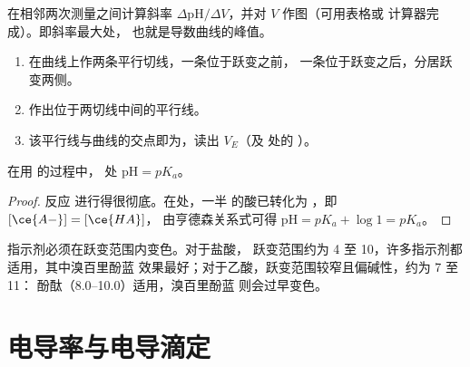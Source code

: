 \begin{method}[导数法]\label{met:g12:ph-conductivity-titrations:derivative}
在相邻两次测量之间计算斜率
$\Delta\mathrm{pH}/\Delta V$，并对 $V$ 作图（可用表格或
计算器完成）。即斜率最大处，
也就是导数曲线的峰值。
\end{method}

\begin{method}[切线法]\label{met:g12:ph-conductivity-titrations:tangent}
\begin{enumerate}
  \item 在曲线上作两条平行切线，一条位于跃变之前，
        一条位于跃变之后，分居跃变两侧。
  \item 作出位于两切线中间的平行线。
  \item 该平行线与曲线的交点即为，读出 $V_E$（及
        处的 ）。
\end{enumerate}
\end{method}

\begin{proposition}[半等当点处，$\mathrm{pH} = pK_a$]\label{prop:g12:ph-conductivity-titrations:half}
在用  的过程中，
处 $\mathrm{pH} = pK_a$。
\end{proposition}

\begin{proof}
反应  进行得很彻底。在处，一半
的酸已转化为 ，即 $[\ce{A-}] = [\ce{HA}]$，
由亨德森关系式可得 $\mathrm{pH} = pK_a + \log 1 = pK_a$。
\end{proof}

\begin{remark}[从曲线选择指示剂]\label{rem:g12:ph-conductivity-titrations:indicator}
指示剂必须在跃变范围内变色。对于盐酸，
跃变范围约为  4 至 10，许多指示剂都适用，其中溴百里酚蓝
效果最好；对于乙酸，跃变范围较窄且偏碱性，约为 7 至 11：
酚酞（8.0--10.0）适用，溴百里酚蓝
则会过早变色。
\end{remark}

\section{电导率与电导滴定}


